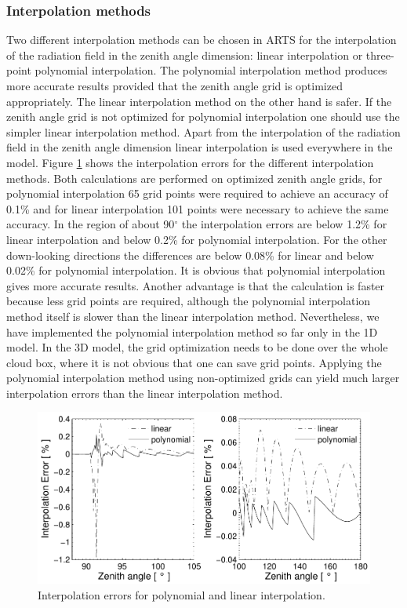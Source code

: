 \subsubsection{Interpolation methods}
Two different interpolation methods can be chosen in ARTS for the
interpolation of the radiation field in the zenith angle dimension:
linear interpolation or three-point polynomial interpolation. The polynomial interpolation
method produces more accurate results provided that the zenith angle
grid is optimized appropriately. The linear interpolation method on
the other hand is safer. If the zenith angle grid is not optimized for
polynomial interpolation one should use the simpler linear interpolation
method.  Apart from the interpolation of the radiation field in the
zenith angle dimension linear interpolation is used everywhere in the
model.  Figure \ref{fig:scattering:interp} shows the interpolation errors for the
different interpolation methods.  Both calculations are performed on
optimized zenith angle grids, for polynomial interpolation 65 grid points
were required to achieve an accuracy of 0.1\% and for linear
interpolation 101 points were necessary to achieve the same accuracy.
In the region of about 90$^\circ$ the interpolation errors are below
1.2\% for linear interpolation and below 0.2\% for polynomial
interpolation. For the other down-looking directions the differences
are below 0.08\% for linear and below 0.02\% for polynomial interpolation.
It is obvious that polynomial interpolation gives more accurate results.
Another advantage is that the calculation is faster because less grid
points are required, although the polynomial interpolation method itself is
slower than the linear interpolation method.  Nevertheless, we have
implemented the polynomial interpolation method so far only in the 1D
model. In the 3D model, the grid optimization needs to be done over
the whole cloud box, where it is not obvious that
one can save grid points. Applying the polynomial interpolation method
using non-optimized grids can yield much larger interpolation errors
than the linear interpolation method.

\begin{figure}[htbp]
\centering
  \includegraphics[width=.9\hsize]{interp}
  \caption{Interpolation errors for polynomial and linear interpolation.
  }
  \label{fig:scattering:interp}  
\end{figure}

